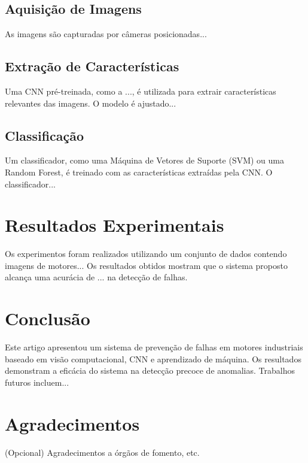 \documentclass[conference]{IEEEtran}
\begin{document}
\subsection{Aquisição de Imagens}
As imagens são capturadas por câmeras posicionadas...

\subsection{Extração de Características}
Uma CNN pré-treinada, como a ..., é utilizada para extrair características relevantes das imagens. O modelo é ajustado...

\subsection{Classificação}
Um classificador, como uma Máquina de Vetores de Suporte (SVM) ou uma Random Forest, é treinado com as características extraídas pela CNN. O classificador...

\section{Resultados Experimentais}
Os experimentos foram realizados utilizando um conjunto de dados contendo imagens de motores... Os resultados obtidos mostram que o sistema proposto alcança uma acurácia de ... na detecção de falhas.

\section{Conclusão}
Este artigo apresentou um sistema de prevenção de falhas em motores industriais baseado em visão computacional, CNN e aprendizado de máquina. Os resultados demonstram a eficácia do sistema na detecção precoce de anomalias. Trabalhos futuros incluem...

\section*{Agradecimentos}
(Opcional) Agradecimentos a órgãos de fomento, etc.



\end{document}
